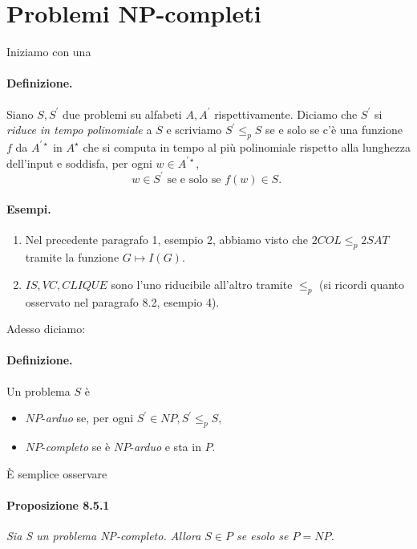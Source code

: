 \section{Problemi NP-completi}

Iniziamo con una
\paragraph{Definizione.} Siano $S, S^{\prime}$ due problemi su alfabeti $A,
    A^{\prime}$ rispettivamente. Diciamo che $S^{\prime}$ si \textit{riduce in tempo
    polinomiale} a $S$ e scriviamo $S^{\prime} \leq_p S$ se e solo se c'è una funzione $f$
da $A^{\prime \star}$ in $A^{\star}$ che si computa in tempo al più
polinomiale rispetto alla lunghezza dell'input e soddisfa, per ogni $w \in
    A^{\prime \star}$,
$$
    w \in S^{\prime} \text { se e solo se } f(w) \in S \text {. }
$$

\paragraph{Esempi.}
\begin{enumerate}
    \item Nel precedente paragrafo 1, esempio 2, abbiamo visto che $2 C O L
              \leq_p 2 S A T$ tramite la funzione $G \mapsto I(G)$.
    \item $I S, V C, C L I Q U E$ sono l'uno riducibile all'altro tramite
          $\leq_p$ (si ricordi quanto osservato nel paragrafo 8.2, esempio 4).
\end{enumerate}

Adesso diciamo:

\paragraph{Definizione.} Un problema $S$ è
\begin{itemize}
    \item $N P$-\textit{arduo} se, per ogni $S^{\prime} \in N P, S^{\prime}
              \leq_p S$,
    \item $N P$-\textit{completo} se è $N P$-\textit{arduo} e sta in $P$.
\end{itemize}

È semplice osservare

\paragraph{Proposizione 8.5.1} \textit{Sia S un problema NP-completo. Allora $S
        \in P$ se esolo se $P=N P$.}

